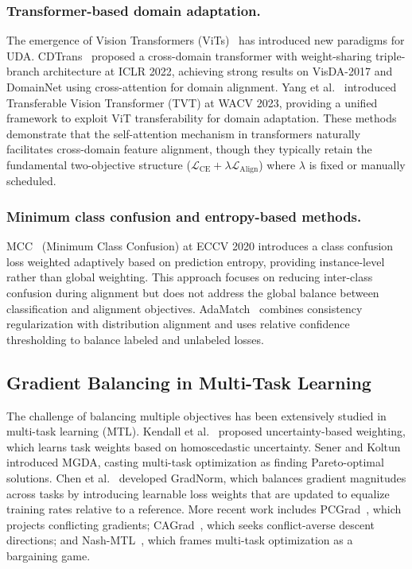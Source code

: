 \documentclass[pdflatex,sn-mathphys-num]{sn-jnl}
\theoremstyle{thmstyleone}
\theoremstyle{thmstyletwo}
\theoremstyle{thmstylethree}
\begin{document}
\subsubsection{Transformer-based domain adaptation.}
The emergence of Vision Transformers (ViTs)~\cite{dosovitskiy2021vit} has introduced new paradigms for UDA. CDTrans~\cite{xu2022cdtrans} proposed a cross-domain transformer with weight-sharing triple-branch architecture at ICLR 2022, achieving strong results on VisDA-2017 and DomainNet using cross-attention for domain alignment. Yang et al.~\cite{yang2023tvt} introduced Transferable Vision Transformer (TVT) at WACV 2023, providing a unified framework to exploit ViT transferability for domain adaptation. These methods demonstrate that the self-attention mechanism in transformers naturally facilitates cross-domain feature alignment, though they typically retain the fundamental two-objective structure ($\mathcal{L}_{\text{CE}} + \lambda \mathcal{L}_{\text{Align}}$) where $\lambda$ is fixed or manually scheduled.

\subsubsection{Minimum class confusion and entropy-based methods.}
MCC~\cite{jin2020mcc} (Minimum Class Confusion) at ECCV 2020 introduces a class confusion loss weighted adaptively based on prediction entropy, providing instance-level rather than global weighting. This approach focuses on reducing inter-class confusion during alignment but does not address the global balance between classification and alignment objectives. AdaMatch~\cite{berthelot2021adamatch} combines consistency regularization with distribution alignment and uses relative confidence thresholding to balance labeled and unlabeled losses.

\subsection{Gradient Balancing in Multi-Task Learning}

The challenge of balancing multiple objectives has been extensively studied in multi-task learning (MTL). Kendall et al.~\cite{kendall2018uncertainty} proposed uncertainty-based weighting, which learns task weights based on homoscedastic uncertainty. Sener and Koltun~\cite{sener2018mgda} introduced MGDA, casting multi-task optimization as finding Pareto-optimal solutions. Chen et al.~\cite{chen2018gradnorm} developed GradNorm, which balances gradient magnitudes across tasks by introducing learnable loss weights that are updated to equalize training rates relative to a reference. More recent work includes PCGrad~\cite{yu2020pcgrad}, which projects conflicting gradients; CAGrad~\cite{liu2021conflictaverse}, which seeks conflict-averse descent directions; and Nash-MTL~\cite{navon2022nashmtl}, which frames multi-task optimization as a bargaining game.
\end{document}
